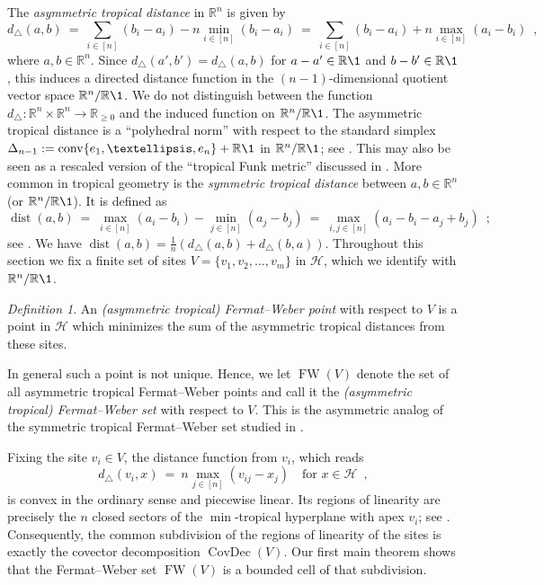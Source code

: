 \documentclass[a4paper,12pt]{amsart}
\newcommand\RR{{\mathbb R}}
\newcommand\cH{{\mathcal H}}
\newcommand\torus[1]{\RR^{#1}/\RR\1} %
\DeclareMathOperator\dist{dist}
\DeclareMathOperator\conv{conv}
\DeclareMathOperator{\FW}{FW} %
\DeclareMathOperator\CovDec{CovDec} %
\theoremstyle{remark}
\newtheorem{definition}[theorem]{Definition}
\begin{document}
The \emph{asymmetric tropical distance} in $\RR^n$ is given by
\begin{equation}\label{eq:d-triangle}
  d_\triangle(a,b) \ = \ \sum_{i\in[n]} (b_i-a_i) - n \min_{i\in[n]}(b_i-a_i) \ = \ \sum_{i\in[n]} (b_i-a_i) + n \max_{i\in[n]}(a_i-b_i) \enspace ,
\end{equation}
where $a, b\in\RR^n$.
Since $d_\triangle(a',b')=d_\triangle(a,b)$ for $a-a'\in\RR\1$ and $b-b'\in\RR\1$, this induces a directed distance function in the $(n{-}1)$-dimensional quotient vector space $\torus{n}$.
We do not distinguish between the function $d_\triangle:\RR^n\times\RR^n\to\RR_ {\geq0}$ and the induced function on $\torus{n}$.
The asymmetric tropical distance is a \enquote{polyhedral norm} with respect to the standard simplex $\Delta_{n-1}:=\conv\{e_1,\dots,e_n\}+\RR\1$ in $\torus{n}$; see \cite[]{BMS:1999}. %
This may also be seen as a rescaled version of the \enquote{tropical Funk metric} discussed in \cite[]{ABGJ:2018}.
More common in tropical geometry is the \emph{symmetric tropical distance} between $a,b\in\RR^n$ (or $\torus{n}$).
It is defined as
\[
  \dist(a,b) \ = \ \max_{i\in[n]} \left(a_i-b_i\right) - \min_{j\in[n]} \left(a_j-b_j\right) \ = \ \max_{i,j\in[n]}(a_i-b_i-a_j+b_j) \enspace ;
\]
see \cite[]{ETC}.
We have $\dist(a,b) = \tfrac{1}{n}(d_{\triangle}(a,b) + d_\triangle(b,a))$.
Throughout this section we fix a finite set of sites $V=\{v_1,v_2,\dots,v_m\}$ in $\cH$, which we identify with $\torus{n}$.
\begin{definition}
  An \emph{(asymmetric tropical) Fermat--Weber point} with respect to $V$ is a point in $\cH$ which minimizes the sum of the asymmetric tropical distances from these sites.
\end{definition}
In general such a point is not unique.
Hence, we let $\FW(V)$ denote the set of all asymmetric tropical Fermat--Weber points and call it the \emph{(asymmetric tropical) Fermat--Weber set} with respect to $V$.
This is the asymmetric analog of the symmetric tropical Fermat--Weber set studied in \cite{Lin-Yoshida:2018}.

Fixing the site $v_i\in V$, the distance function from $v_i$, which reads
\begin{equation}\label{eq:from-the-sites}
  d_\triangle(v_i,x) \ = \ n \max_{j\in[n]} (v_{ij}-x_j) \quad \text{for } x\in\cH \enspace,
\end{equation}
is convex in the ordinary sense and piecewise linear.
Its regions of linearity are precisely the $n$ closed sectors of the $\min$-tropical hyperplane with apex $v_i$; see \cite[]{ETC}.
Consequently, the common subdivision of the regions of linearity of the sites is exactly the covector decomposition $\CovDec(V)$.
Our first main theorem shows that the Fermat--Weber set $\FW(V)$ is a bounded cell of that subdivision.
\end{document}
